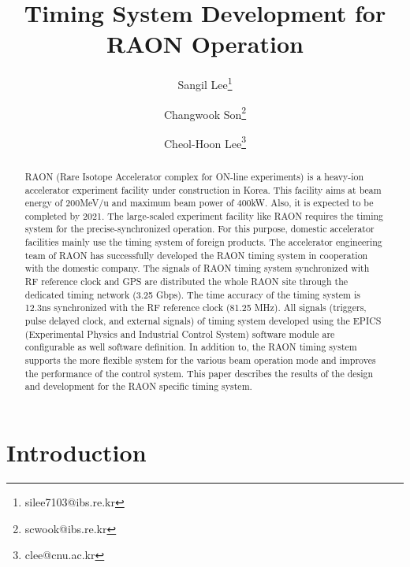 \documentclass[journal]{IEEEtran}
\begin{document}
\title{
	\textbf{Timing System Development for RAON Operation} %
	\vspace{0.5cm}
	\Large
}
\author[1]{Sangil Lee\thanks{silee7103@ibs.re.kr}}
\author[2]{Changwook Son\thanks{scwook@ibs.re.kr}}
\author[3]{Cheol-Hoon Lee\thanks{clee@cnu.ac.kr}}
\date{}
\maketitle
\vspace{2em}

\begin{abstract}
RAON (Rare Isotope Accelerator complex for ON-line experiments) is a heavy-ion accelerator experiment facility under construction in Korea. This facility aims at beam energy of 200MeV/u and maximum beam power of 400kW. Also, it is expected to be completed by 2021. The large-scaled experiment facility like RAON requires the timing system for the precise-synchronized operation. For this purpose, domestic accelerator facilities mainly use the timing system of foreign products. The accelerator engineering team of RAON has successfully developed the RAON timing system in cooperation with the domestic company. The signals of RAON timing system synchronized with RF reference clock and GPS are distributed the whole RAON site through the dedicated timing network (3.25 Gbps). The time accuracy of the timing system is 12.3ns synchronized with the RF reference clock (81.25 MHz). All signals (triggers, pulse delayed clock, and external signals) of timing system developed using the EPICS (Experimental Physics and Industrial Control System) software module are configurable as well software definition. In addition to, the RAON timing system supports the more flexible system for the various beam operation mode and improves the performance of the control system. \newline
This paper describes the results of the design and development for the RAON specific timing system.
\end{abstract}



\section{Introduction}
% 
% 
% 
% 
\end{document}
